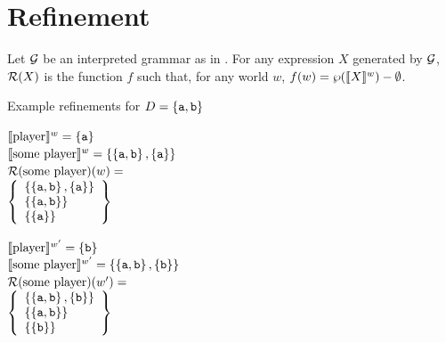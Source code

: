 \documentclass{article}
\begin{document}

\section{Refinement}

\begin{examples}
\item\label{refinement} Let $\Grammar$ be an interpreted grammar as in
  .  For any expression $X$ generated by $\Grammar$,
  $\Refine(X)$ is the function $f$ such that, for any world $w$,
  $f(w) = \wp(\semw{$X$}) - \emptyset$.

\item Example refinements for $D = \set{\playera,\playerb}$
 
  \begin{minipage}[t]{0.48\linewidth}
    $\semw{player} = \set{\playera}$ \\[2ex]    
    $\semw{some player} = \set{\set{\playera,\playerb}, \set{\playera}}$ \\[2ex]    
    $\Refine(\text{some player})(w) =$\\[2ex]
    $\set{
      \begin{array}[c]{l}
        \set{\set{\playera,\playerb}, \set{\playera}} \\
        \set{\set{\playera,\playerb}} \\
        \set{\set{\playera}} \\
      \end{array}
    }$    
  \end{minipage}
  \hfill
  \begin{minipage}[t]{0.48\linewidth}
    $\semw[w']{player} = \set{\playerb}$ \\[2ex]    
    $\semw[w']{some player} = \set{\set{\playera,\playerb}, \set{\playerb}}$ \\[2ex]    
    $\Refine(\text{some player})(w') =$ \\[2ex]
    $\set{
      \begin{array}[c]{l}
        \set{\set{\playera,\playerb}, \set{\playerb}} \\
        \set{\set{\playera,\playerb}} \\
        \set{\set{\playerb}} \\
      \end{array}
    }$    
  \end{minipage}  
\end{examples}
\end{document}
